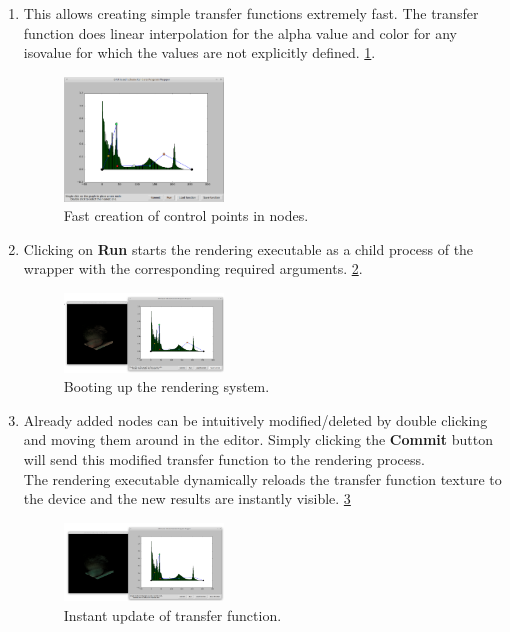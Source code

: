 \documentclass[letterpaper,11pt]{report}
\begin{document}
\begin{enumerate}
    \item
    This allows creating simple transfer functions extremely fast. The transfer function does linear interpolation for the alpha value and color for any isovalue for which the values are not explicitly defined. \ref{fig:working4}.

    \begin{figure}[h!]
     \centering
      \includegraphics[width=0.4\textwidth]{working4.png}
      \caption{Fast creation of control points in nodes.}
      \label{fig:working4}
     \end{figure}

     \item
     Clicking on \textbf{Run} starts the rendering executable as a child process of the wrapper with the corresponding required arguments. \ref{fig:working5}.

    \begin{figure}[h!]
     \centering
      \includegraphics[width=0.4\textwidth]{working5.png}
      \caption{Booting up the rendering system.}
      \label{fig:working5}
     \end{figure}

\newpage

     \item
     Already added nodes can be intuitively modified/deleted by double clicking and moving them around in the editor. Simply clicking the \textbf{Commit} button will send this modified transfer function to the rendering process.\\
     The rendering executable dynamically reloads the transfer function texture to the device and the new results are instantly visible. \ref{fig:working6}

    \begin{figure}[h!]
     \centering
      \includegraphics[width=0.4\textwidth]{working6.png}
      \caption{Instant update of transfer function.}
      \label{fig:working6}
     \end{figure}


\end{enumerate}
\end{document}
